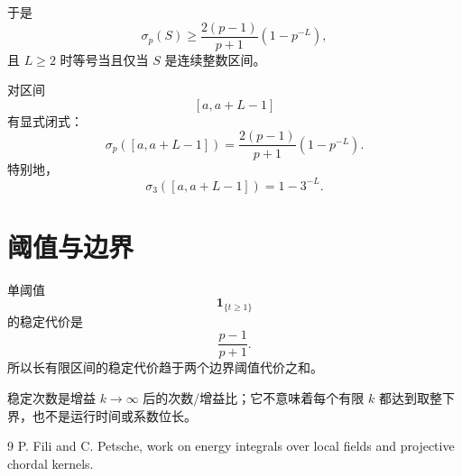 \documentclass[11pt,a4paper]{ctexart}
\begin{document}
于是
\[
\boxed{
\sigma_p(S)
\ge
\frac{2(p-1)}{p+1}(1-p^{-L}),
}
\]
且 \(L\ge2\) 时等号当且仅当 \(S\) 是连续整数区间。

对区间
\[
[a,a+L-1]
\]
有显式闭式：
\[
\boxed{
\sigma_p([a,a+L-1])
=
\frac{2(p-1)}{p+1}(1-p^{-L}).
}
\]
特别地，
\[
\boxed{
\sigma_3([a,a+L-1])
=
1-3^{-L}.
}
\]

\section{阈值与边界}
单阈值
\[
\mathbf1_{\{t\ge1\}}
\]
的稳定代价是
\[
\boxed{
\frac{p-1}{p+1}.
}
\]
所以长有限区间的稳定代价趋于两个边界阈值代价之和。

稳定次数是增益 \(k\to\infty\) 后的次数/增益比；它不意味着每个有限 \(k\) 都达到取整下界，也不是运行时间或系数位长。

\begin{thebibliography}{9}
 P. Fili and C. Petsche, work on energy integrals over local fields and projective chordal kernels.
\end{thebibliography}
\end{document}
